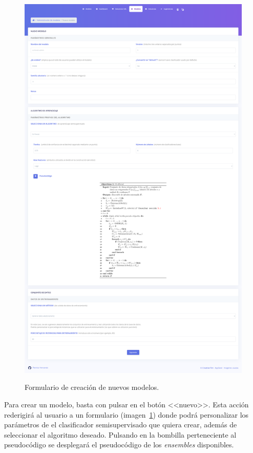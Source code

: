 \begin{figure}[h]
	\caption[Manual de usuario: nuevo modelo]{Formulario de creación de nuevos modelos.}
	\centering
	\includegraphics[width=\textwidth]{../img/anexos/user_guide/5_new_model}
	\label{e-5:new-model}
\end{figure}

Para crear un modelo, basta con pulsar en el botón <<nuevo>>. Esta acción rederigirá al usuario a un formulario (imagen~\ref{e-5:new-model}) donde podrá personalizar los parámetros de el clasificador semisupervisado que quiera crear, además de seleccionar el algoritmo deseado. Pulsando en la bombilla perteneciente al pseudocódigo se desplegará el pseudocódigo de los \textit{ensembles} disponibles.

